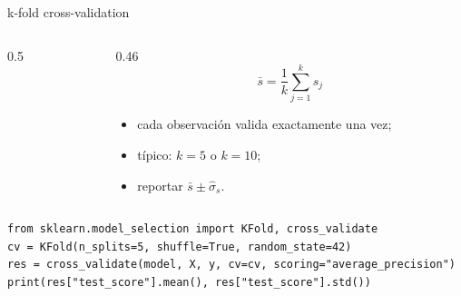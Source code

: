 \documentclass[aspectratio=169,12pt]{beamer}
\begin{document}
\begin{frame}[fragile]{k-fold cross-validation}
  \begin{columns}[c]
    \begin{column}{0.5\textwidth}
      \centering
    \end{column}
    \begin{column}{0.46\textwidth}
      \[ \bar{s} = \frac{1}{k}\sum_{j=1}^{k} s_j \]
      \small
      \begin{itemize}
        \item cada observación valida exactamente una vez;
        \item típico: $k = 5$ o $k = 10$;
        \item reportar $\bar{s} \pm \hat{\sigma}_s$.
      \end{itemize}
    \end{column}
  \end{columns}
\begin{lstlisting}[basicstyle=\ttfamily\scriptsize,columns=fullflexible,keepspaces=true]
from sklearn.model_selection import KFold, cross_validate
cv = KFold(n_splits=5, shuffle=True, random_state=42)
res = cross_validate(model, X, y, cv=cv, scoring="average_precision")
print(res["test_score"].mean(), res["test_score"].std())
\end{lstlisting}
\end{frame}
\end{document}
